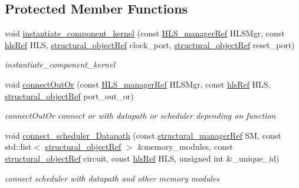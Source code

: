 \subsection*{Protected Member Functions}
\begin{DoxyCompactItemize}
\item 
void \hyperlink{classfu__binding__cs_a02044c5bcc02dfc528c7c3b80c762d4a}{instantiate\+\_\+component\+\_\+kernel} (const \hyperlink{hls__manager_8hpp_acd3842b8589fe52c08fc0b2fcc813bfe}{H\+L\+S\+\_\+manager\+Ref} H\+L\+S\+Mgr, const \hyperlink{hls_8hpp_a75d0c73923d0ddfa28c4843a802c73a7}{hls\+Ref} H\+LS, \hyperlink{structural__objects_8hpp_a8ea5f8cc50ab8f4c31e2751074ff60b2}{structural\+\_\+object\+Ref} clock\+\_\+port, \hyperlink{structural__objects_8hpp_a8ea5f8cc50ab8f4c31e2751074ff60b2}{structural\+\_\+object\+Ref} reset\+\_\+port)
\begin{DoxyCompactList}\small\item\em instantiate\+\_\+component\+\_\+kernel \end{DoxyCompactList}\item 
void \hyperlink{classfu__binding__cs_afc3cb496a8c77b5f9f79a83967c1c3f3}{connect\+Out\+Or} (const \hyperlink{hls__manager_8hpp_acd3842b8589fe52c08fc0b2fcc813bfe}{H\+L\+S\+\_\+manager\+Ref} H\+L\+S\+Mgr, const \hyperlink{hls_8hpp_a75d0c73923d0ddfa28c4843a802c73a7}{hls\+Ref} H\+LS, \hyperlink{structural__objects_8hpp_a8ea5f8cc50ab8f4c31e2751074ff60b2}{structural\+\_\+object\+Ref} port\+\_\+out\+\_\+or)
\begin{DoxyCompactList}\small\item\em connect\+Out\+Or connect or with datapath or scheduler depending on function \end{DoxyCompactList}\item 
void \hyperlink{classfu__binding__cs_a6d6fae4e5427563ae0deb3ad85953dd9}{connect\+\_\+scheduler\+\_\+\+Datapath} (const \hyperlink{structural__manager_8hpp_ab3136f0e785d8535f8d252a7b53db5b5}{structural\+\_\+manager\+Ref} SM, const std\+::list$<$ \hyperlink{structural__objects_8hpp_a8ea5f8cc50ab8f4c31e2751074ff60b2}{structural\+\_\+object\+Ref} $>$ \&memory\+\_\+modules, const \hyperlink{structural__objects_8hpp_a8ea5f8cc50ab8f4c31e2751074ff60b2}{structural\+\_\+object\+Ref} circuit, const \hyperlink{hls_8hpp_a75d0c73923d0ddfa28c4843a802c73a7}{hls\+Ref} H\+LS, unsigned int \&\+\_\+unique\+\_\+id)
\begin{DoxyCompactList}\small\item\em connect scheduler with datapath and other memory modules \end{DoxyCompactList}\item 

\end{DoxyCompactItemize}
